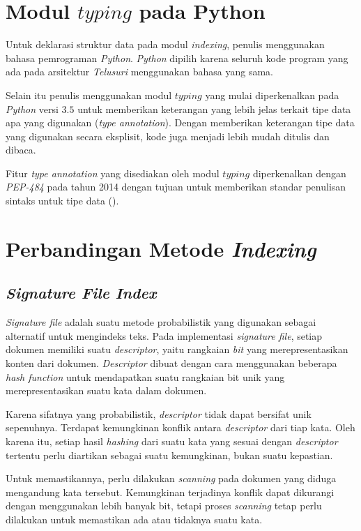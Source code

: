 \section{Modul $typing$ pada Python}

Untuk deklarasi struktur data pada modul \textit{indexing}, penulis menggunakan
bahasa pemrograman \textit{Python}. \textit{Python} dipilih karena seluruh kode
program yang ada pada arsitektur \textit{Telusuri} menggunakan bahasa yang sama.

Selain itu penulis menggunakan modul $typing$ yang mulai diperkenalkan pada
\textit{Python} versi $3.5$ untuk memberikan keterangan yang lebih jelas terkait
tipe data apa yang digunakan (\textit{type annotation}). Dengan memberikan 
keterangan tipe data yang digunakan secara eksplisit, kode juga menjadi lebih 
mudah ditulis dan dibaca.

Fitur \textit{type annotation} yang disediakan oleh modul $typing$ diperkenalkan 
dengan \textit{PEP-484} pada tahun 2014 dengan tujuan untuk memberikan standar 
penulisan sintaks untuk tipe data (\cite{python484pep}).

\section{Perbandingan Metode \emph{Indexing}}

\subsection{\emph{Signature File Index}}

\emph{Signature file} adalah suatu metode probabilistik yang digunakan sebagai
alternatif untuk mengindeks teks. Pada implementasi \emph{signature file},
setiap dokumen memiliki suatu \emph{descriptor}, yaitu rangkaian \emph{bit} yang
merepresentasikan konten dari dokumen. \emph{Descriptor} dibuat dengan cara
menggunakan beberapa \emph{hash function} untuk mendapatkan suatu rangkaian bit
unik yang merepresentasikan suatu kata dalam dokumen. 

Karena sifatnya yang probabilistik, \emph{descriptor} tidak dapat bersifat unik
sepenuhnya. Terdapat kemungkinan konflik antara \emph{descriptor} dari tiap
kata. Oleh karena itu, setiap hasil \emph{hashing} dari suatu kata yang sesuai
dengan \emph{descriptor} tertentu perlu diartikan sebagai suatu kemungkinan,
bukan suatu kepastian.

Untuk memastikannya, perlu dilakukan \emph{scanning} pada dokumen yang diduga
mengandung kata tersebut. Kemungkinan terjadinya konflik dapat dikurangi dengan
menggunakan lebih banyak bit, tetapi proses \emph{scanning} tetap perlu
dilakukan untuk memastikan ada atau tidaknya suatu kata.

